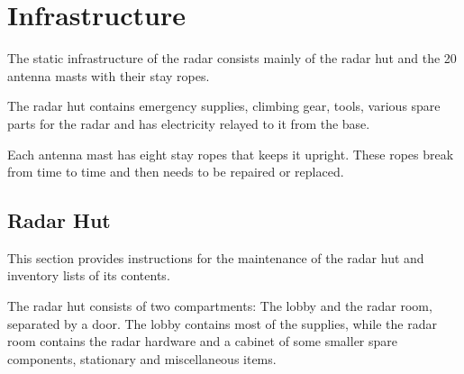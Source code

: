 \section{Infrastructure}
\label{sec:infrastructure}
The static infrastructure of the radar consists mainly of the radar hut and the 20 antenna masts with their stay ropes.
\par
The radar hut contains emergency supplies, climbing gear, tools, various spare parts for the radar and has electricity relayed to it from the base.
\par
Each antenna mast has eight stay ropes that keeps it upright. These ropes break from time to time and then needs to be repaired or replaced.


\subsection{Radar Hut}
\label{subsec:infra_hut}
This section provides instructions for the maintenance of the radar hut and inventory lists of its contents.
\par
The radar hut consists of two compartments: The lobby and the radar room, separated by a door. The lobby contains most of the supplies, while the radar room contains the radar hardware and a cabinet of some smaller spare components, stationary and miscellaneous items.

